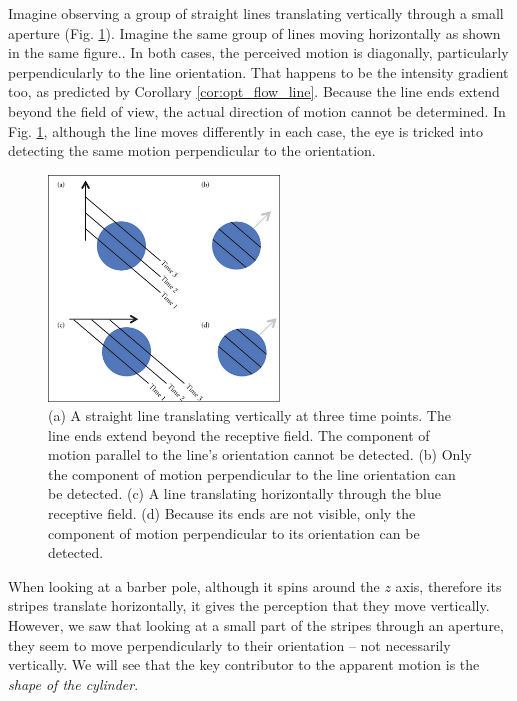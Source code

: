 \documentclass[a4paper]{article}
\begin{document}
Imagine observing a group of straight lines translating vertically through a small aperture (Fig. \ref{fig:line_motion}). Imagine the same group of lines moving horizontally as shown in the same figure.. In both cases, the perceived motion is diagonally, particularly perpendicularly to the line orientation. That happens to be the intensity gradient too, as predicted by Corollary \ref{cor:opt_flow_line}. Because the line ends extend beyond the field of view, the actual direction of motion cannot be determined. In Fig. \ref{fig:line_motion}, although the line moves differently in each case, the eye is tricked into detecting the same motion perpendicular to the orientation.
\begin{figure}[H]
    \centering
    \includegraphics[height=6cm]{img/opt_flow/lines_motion.png}
    \caption{(a) A straight line translating vertically at three time points. The line ends extend beyond the receptive field. The component of motion parallel to the line's orientation cannot be detected. (b) Only the component of motion perpendicular to the line orientation can be detected. (c) A line translating horizontally through the blue receptive field. (d) Because its ends are not visible, only the component of motion perpendicular to its orientation can be detected.}
    \label{fig:line_motion}
\end{figure}
When looking at a barber pole, although it spins around the $z$ axis, therefore its stripes translate horizontally, it gives the perception that they move vertically. However, we saw that looking at a small part of the stripes through an aperture, they seem to move perpendicularly to their orientation -- not necessarily vertically. We will see that the key contributor to the apparent motion is the \textit{shape of the cylinder}. 
\end{document}
